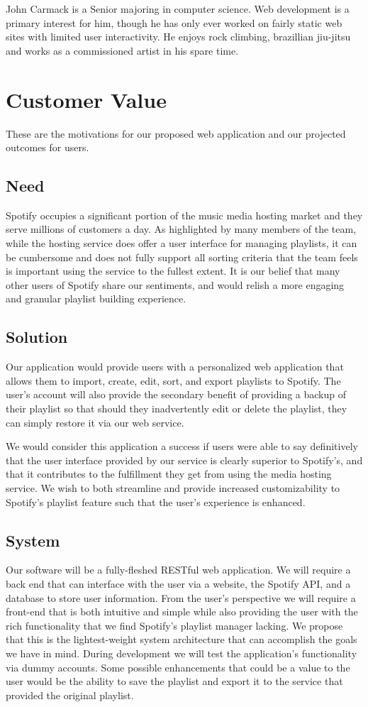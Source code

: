 \documentclass{article}
\begin{document}
John Carmack is a Senior majoring in computer science. Web development is a primary interest for him, though he has only ever worked on fairly static web sites with limited user interactivity. He enjoys rock climbing, brazillian jiu-jitsu and works as a commissioned artist in his spare time.

\section{Customer Value}
These are the motivations for our proposed web application and our projected outcomes for users. 
\subsection{Need}
Spotify occupies a significant portion of the music media hosting market and they serve millions of customers a day. As highlighted by many members of the team, while the hosting service does offer a user interface for managing playlists, it can be cumbersome and does not fully support all sorting criteria that the team feels is important using the service to the fullest extent. It is our belief that many other users of Spotify share our sentiments, and would relish a more engaging and granular playlist building experience. 
\subsection{Solution}
Our application would provide users with a personalized web application that allows them to import, create, edit, sort, and export playlists to Spotify. The user’s account will also provide the secondary benefit of providing a backup of their playlist so that should they inadvertently edit or delete the playlist, they can simply restore it via our web service. 

We would consider this application a success if users were able to say definitively that the user interface provided by our service is clearly superior to Spotify’s, and that it contributes to the fulfillment they get from using the media hosting service. We wish to both streamline and provide increased customizability to Spotify’s playlist feature such that the user’s experience is enhanced.
\subsection{System}
Our software will be a fully-fleshed RESTful web application. We will require a back end that can interface with the user via a website, the Spotify API, and a database to store user information. From the user’s perspective we will require a front-end that is both intuitive and simple while also providing the user with the rich functionality that we find Spotify’s playlist manager lacking. We propose that this is the lightest-weight system architecture that can accomplish the goals we have in mind. During development we will test the application’s functionality via dummy accounts. Some possible enhancements that could be a value to the user would be the ability to save the playlist and export it to the service that provided the original playlist.
\end{document}
